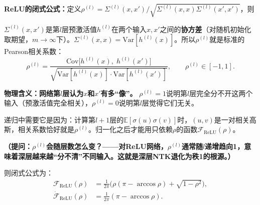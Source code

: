 \documentclass[11pt,a4paper]{article}
\newcommand{\E}{\mathbb{E}}
\begin{document}
\textbf{ReLU的闭式公式：}定义$\rho^{(l)} = \Sigma^{(l)}(x,x')/\sqrt{\Sigma^{(l)}(x,x)\Sigma^{(l)}(x',x')}$，则

\begin{keyinsight}
$\Sigma^{(l)}(x,x')$是第$l$层预激活值$h^{(l)}$在两个输入$x,x'$之间的\textbf{协方差}（对随机初始化取期望，$m\to\infty$下）。$\Sigma^{(l)}(x,x)=\text{Var}[h^{(l)}(x)]$。所以$\rho^{(l)}$就是标准的Pearson相关系数：
\[
\rho^{(l)} = \frac{\text{Cov}\big[h^{(l)}(x),\; h^{(l)}(x')\big]}{\sqrt{\text{Var}[h^{(l)}(x)]\cdot\text{Var}[h^{(l)}(x')]}}, \qquad \rho^{(l)}\in[-1,1].
\]

\textbf{物理含义：网络第$l$层认为$x$和$x'$有多``像''。} $\rho^{(l)}=1$说明第$l$层完全分不开这两个输入（预激活值完全相关），$\rho^{(l)}=0$说明第$l$层觉得它们无关。

递归中需要它是因为：计算第$l+1$层的$\E[\sigma(u)\sigma(v)]$时，$(u,v)$是一对相关高斯，相关系数恰好就是$\rho^{(l)}$。归一化之后才能用只依赖$\rho$的函数$\mathcal{F}_{\text{ReLU}}(\rho)$。

\textbf{（提问：$\rho^{(l)}$会随层数怎么变？——对ReLU网络，$\rho^{(l)}$通常随$l$递增趋向1，意味着深层越来越``分不清''不同输入。这就是深层NTK退化为秩1的根源。）}
\end{keyinsight}

则闭式公式为：
\begin{align}
\mathcal{F}_{\text{ReLU}}(\rho) &= \frac{1}{2\pi}\big(\rho(\pi-\arccos\rho)+\sqrt{1-\rho^2}\big), \\
\dot{\mathcal{F}}_{\text{ReLU}}(\rho) &= \frac{1}{2\pi}(\pi-\arccos\rho).
\end{align}
\end{document}

